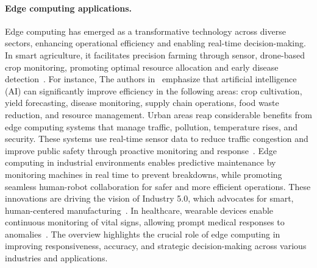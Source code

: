 
\paragraph{Edge computing applications.}
Edge computing has emerged as a transformative technology across diverse sectors, enhancing operational efficiency and enabling real-time decision-making. In smart agriculture, it facilitates precision farming through sensor, drone-based crop monitoring, promoting optimal resource allocation and early disease detection~\cite{akhtar2021smart,junaidi2025deep,dhifaoui2022cloud}. For instance, The authors in~\cite{pandey2024towards} emphasize that artificial intelligence (AI) can significantly improve efficiency in the following areas: crop cultivation, yield forecasting, disease monitoring, supply chain operations, food waste reduction, and resource management.
Urban areas reap considerable benefits from edge computing systems that manage traffic, pollution, temperature rises, and security. These systems use real-time sensor data to reduce traffic congestion and improve public safety through proactive monitoring and response~\cite{xu2023mobile,hossain2018edge}.
Edge computing in industrial environments enables predictive maintenance by monitoring machines in real time to prevent breakdowns, while promoting seamless human-robot collaboration for safer and more efficient operations. These innovations are driving the vision of Industry 5.0, which advocates for smart, human-centered manufacturing~\cite{sharma2024edge}.
In healthcare, wearable devices enable continuous monitoring of vital signs, allowing prompt medical responses to anomalies~\cite{rancea2024edge}. The overview highlights the crucial role of edge computing in improving responsiveness, accuracy, and strategic decision-making across various industries and applications.

